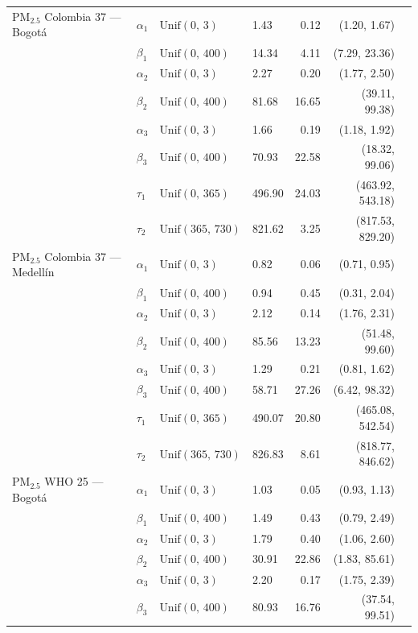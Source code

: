 \begin{longtable}{llllrrr}
PM$_{2.5}$ Colombia 37 --- Bogot\'{a} & $\alpha_{1}$ & $\text{Unif}(0,\,3)$ & 1.43 & 0.12 & (1.20, 1.67) \\
 & $\beta_{1}$ & $\text{Unif}(0,\,400)$ & 14.34 & 4.11 & (7.29, 23.36) \\
 & $\alpha_{2}$ & $\text{Unif}(0,\,3)$ & 2.27 & 0.20 & (1.77, 2.50) \\
 & $\beta_{2}$ & $\text{Unif}(0,\,400)$ & 81.68 & 16.65 & (39.11, 99.38) \\
 & $\alpha_{3}$ & $\text{Unif}(0,\,3)$ & 1.66 & 0.19 & (1.18, 1.92) \\
 & $\beta_{3}$ & $\text{Unif}(0,\,400)$ & 70.93 & 22.58 & (18.32, 99.06) \\
 & $\tau_{1}$ & $\text{Unif}(0,\,365)$ & 496.90 & 24.03 & (463.92, 543.18) \\
 & $\tau_{2}$ & $\text{Unif}(365,\,730)$ & 821.62 & 3.25 & (817.53, 829.20) \\
\midrule
PM$_{2.5}$ Colombia 37 --- Medell\'{i}n & $\alpha_{1}$ & $\text{Unif}(0,\,3)$ & 0.82 & 0.06 & (0.71, 0.95) \\
 & $\beta_{1}$ & $\text{Unif}(0,\,400)$ & 0.94 & 0.45 & (0.31, 2.04) \\
 & $\alpha_{2}$ & $\text{Unif}(0,\,3)$ & 2.12 & 0.14 & (1.76, 2.31) \\
 & $\beta_{2}$ & $\text{Unif}(0,\,400)$ & 85.56 & 13.23 & (51.48, 99.60) \\
 & $\alpha_{3}$ & $\text{Unif}(0,\,3)$ & 1.29 & 0.21 & (0.81, 1.62) \\
 & $\beta_{3}$ & $\text{Unif}(0,\,400)$ & 58.71 & 27.26 & (6.42, 98.32) \\
 & $\tau_{1}$ & $\text{Unif}(0,\,365)$ & 490.07 & 20.80 & (465.08, 542.54) \\
 & $\tau_{2}$ & $\text{Unif}(365,\,730)$ & 826.83 & 8.61 & (818.77, 846.62) \\
\midrule
PM$_{2.5}$ WHO 25 --- Bogot\'{a} & $\alpha_{1}$ & $\text{Unif}(0,\,3)$ & 1.03 & 0.05 & (0.93, 1.13) \\
 & $\beta_{1}$ & $\text{Unif}(0,\,400)$ & 1.49 & 0.43 & (0.79, 2.49) \\
 & $\alpha_{2}$ & $\text{Unif}(0,\,3)$ & 1.79 & 0.40 & (1.06, 2.60) \\
 & $\beta_{2}$ & $\text{Unif}(0,\,400)$ & 30.91 & 22.86 & (1.83, 85.61) \\
 & $\alpha_{3}$ & $\text{Unif}(0,\,3)$ & 2.20 & 0.17 & (1.75, 2.39) \\
 & $\beta_{3}$ & $\text{Unif}(0,\,400)$ & 80.93 & 16.76 & (37.54, 99.51) \\

\end{longtable}
